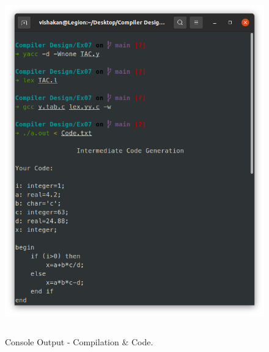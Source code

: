 \documentclass[12pt, a4]{article}
\begin{document}
\newpage
\subsection*{}
\begin{flushleft}

\end{flushleft}

\newpage
\subsection*{}
\begin{flushleft}

\end{flushleft}

\newpage
\subsection*{}
\begin{figure}[h]
\centering
\caption{Console Output - Compilation \& Code.}
\includegraphics[height=15cm, width=15cm]{Output1.png}
\end{figure}
\end{document}
